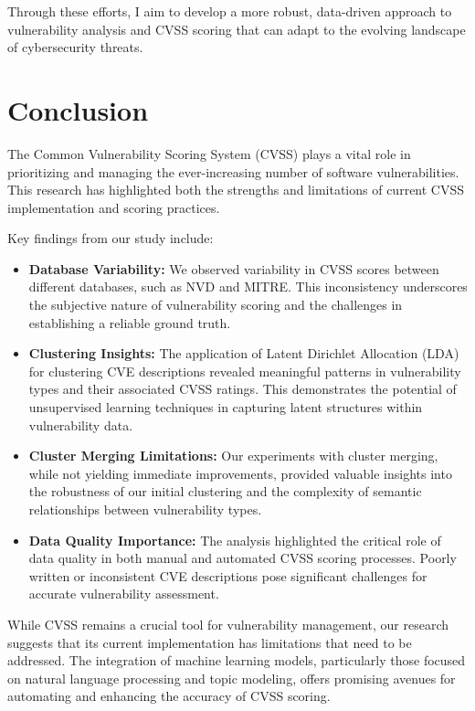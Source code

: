 \documentclass[12pt]{article}
\begin{document}
Through these efforts, I aim to develop a more robust, data-driven approach to vulnerability
analysis and CVSS scoring that can adapt to the evolving landscape of cybersecurity threats.

\section{Conclusion}

The Common Vulnerability Scoring System (CVSS) plays a vital role in prioritizing and managing the
ever-increasing number of software vulnerabilities. This research has highlighted both the strengths
and limitations of current CVSS implementation and scoring practices.

Key findings from our study include:

\begin{itemize}

	\item \textbf{Database Variability:} We observed variability in CVSS scores between
	      different databases, such as NVD and MITRE. This inconsistency underscores the subjective
	      nature of vulnerability scoring and the challenges in establishing a reliable ground truth.

	\item \textbf{Clustering Insights:} The application of Latent Dirichlet Allocation (LDA) for
	      clustering CVE descriptions revealed meaningful patterns in vulnerability types and their
	      associated CVSS ratings. This demonstrates the potential of unsupervised learning techniques
	      in capturing latent structures within vulnerability data.

	\item \textbf{Cluster Merging Limitations:} Our experiments with cluster merging, while not
	      yielding immediate improvements, provided valuable insights into the robustness of our
	      initial clustering and the complexity of semantic relationships between vulnerability types.

	\item \textbf{Data Quality Importance:} The analysis highlighted the critical role of data
	      quality in both manual and automated CVSS scoring processes. Poorly written or inconsistent
	      CVE descriptions pose significant challenges for accurate vulnerability assessment.

\end{itemize}

While CVSS remains a crucial tool for vulnerability management, our research suggests that its
current implementation has limitations that need to be addressed. The integration of machine
learning models, particularly those focused on natural language processing and topic modeling,
offers promising avenues for automating and enhancing the accuracy of CVSS scoring.
\end{document}

